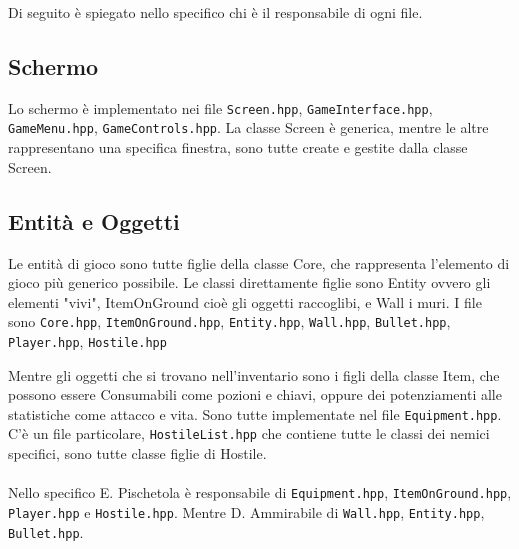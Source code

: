 \documentclass{article}
\begin{document}
Di seguito è spiegato nello specifico chi è il responsabile di ogni file.

\subsection{Schermo}
Lo schermo è implementato nei file \texttt{Screen.hpp}, \texttt{GameInterface.hpp}, \\\texttt{GameMenu.hpp}, \texttt{GameControls.hpp}. La classe Screen è generica, mentre le altre rappresentano una specifica finestra, sono tutte create e gestite dalla classe Screen.

\subsection{Entità e Oggetti}
Le entità di gioco sono tutte figlie della classe Core, che rappresenta l'elemento di gioco più generico possibile. Le classi direttamente figlie sono Entity ovvero gli elementi "vivi", ItemOnGround cioè gli oggetti raccoglibi, e Wall i muri. 
I file sono \texttt{Core.hpp}, \texttt{ItemOnGround.hpp}, \texttt{Entity.hpp}, \texttt{Wall.hpp}, \texttt{Bullet.hpp}, \\\texttt{Player.hpp}, \texttt{Hostile.hpp}

Mentre gli oggetti che si trovano nell'inventario sono i figli della classe Item, che possono essere Consumabili come pozioni e chiavi, oppure dei potenziamenti alle statistiche come attacco e vita. Sono tutte implementate nel file \texttt{Equipment.hpp}.
C'è un file particolare, \texttt{HostileList.hpp} che contiene tutte le classi dei nemici specifici, sono tutte classe figlie di Hostile.
\\\\
Nello specifico E. Pischetola è responsabile di \texttt{Equipment.hpp}, \texttt{ItemOnGround.hpp}, \texttt{Player.hpp} e \texttt{Hostile.hpp}.
Mentre D. Ammirabile di \texttt{Wall.hpp}, \texttt{Entity.hpp}, \texttt{Bullet.hpp}.
\end{document}
